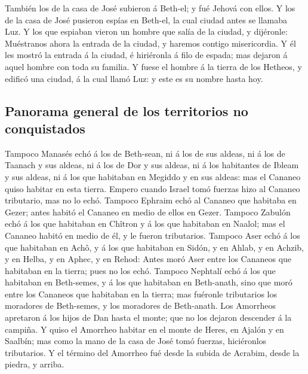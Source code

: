  También los de la casa de José subieron á Beth-el; y fué
Jehová con ellos.  Y los de la casa de José pusieron
espías en Beth-el, la cual ciudad antes se llamaba Luz. 
Y los que espiaban vieron un hombre que salía de la ciudad, y dijéronle:
Muéstranos ahora la entrada de la ciudad, y haremos contigo
misericordia.  Y él les mostró la entrada á la ciudad, é
hiriéronla á filo de espada; mas dejaron á aquel hombre con toda su
familia.  Y fuese el hombre á la tierra de los Hetheos, y
edificó una ciudad, á la cual llamó Luz: y este es su nombre hasta hoy.

\hypertarget{panorama-general-de-los-territorios-no-conquistados}{%
\subsection{Panorama general de los territorios no
conquistados}\label{panorama-general-de-los-territorios-no-conquistados}}

 Tampoco Manasés echó á los de Beth-sean, ni á los de sus
aldeas, ni á los de Taanach y sus aldeas, ni á los de Dor y sus aldeas,
ni á los habitantes de Ibleam y sus aldeas, ni á los que habitaban en
Megiddo y en sus aldeas: mas el Cananeo quiso habitar en esta tierra.
 Empero cuando Israel tomó fuerzas hizo al Cananeo
tributario, mas no lo echó.  Tampoco Ephraim echó al
Cananeo que habitaba en Gezer; antes habitó el Cananeo en medio de ellos
en Gezer.  Tampoco Zabulón echó á los que habitaban en
Chîtron y á los que habitaban en Naalol; mas el Cananeo habitó en medio
de él, y le fueron tributarios.  Tampoco Aser echó á los
que habitaban en Achô, y á los que habitaban en Sidón, y en Ahlab, y en
Achzib, y en Helba, y en Aphec, y en Rehod:  Antes moró
Aser entre los Cananeos que habitaban en la tierra; pues no los echó.
 Tampoco Nephtalí echó á los que habitaban en Beth-semes,
y á los que habitaban en Beth-anath, sino que moró entre los Cananeos
que habitaban en la tierra; mas fuéronle tributarios los moradores de
Beth-semes, y los moradores de Beth-anath.  Los Amorrheos
apretaron á los hijos de Dan hasta el monte; que no los dejaron
descender á la campiña.  Y quiso el Amorrheo habitar en
el monte de Heres, en Ajalón y en Saalbín; mas como la mano de la casa
de José tomó fuerzas, hiciéronlos tributarios.  Y el
término del Amorrheo fué desde la subida de Acrabim, desde la piedra, y
arriba.

